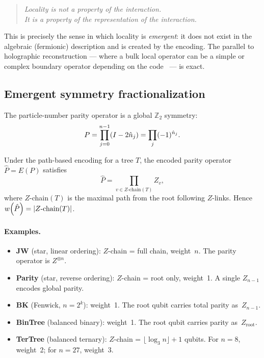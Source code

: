 \begin{quote}\itshape
Locality is not a property of the interaction.\\
It is a property of the \emph{representation} of the interaction.
\end{quote}

This is precisely the sense in which locality is \emph{emergent}: it
does not exist in the algebraic (fermionic) description and is created
by the encoding.  The parallel to holographic reconstruction —  where a
bulk local operator can be a simple or complex boundary operator
depending on the code~\cite{pastawski2015happy} — is exact.


\subsection{Emergent symmetry fractionalization}
\label{sec:em-symmetry}

The particle-number parity operator is a global $\mathbb{Z}_2$ symmetry:
%
\begin{equation}
  P = \prod_{j=0}^{n-1} (I - 2\hat{n}_{j}) = \prod_j (-1)^{\hat{n}_{j}}.
  \label{eq:parity-op}
\end{equation}

\begin{theorem}
\label{thm:parity-weight}
Under the path-based encoding for a tree $T$, the encoded parity
operator $\hat{P} = E(P)$ satisfies
\begin{equation}
  \hat{P} = \prod_{v \in Z\text{-chain}(T)} Z_v,
\end{equation}
where $Z$-chain$(T)$ is the maximal path from the root following
$Z$-links.  Hence $w\!\left(\hat{P}\right) = |Z\text{-chain}(T)|$.
\end{theorem}

\paragraph{Examples.}
\begin{itemize}
  \item \textbf{JW} (star, linear ordering): $Z$-chain = full chain,
    weight~$n$.  The parity operator is $Z^{\otimes n}$.
  \item \textbf{Parity} (star, reverse ordering): $Z$-chain =
    root only, weight~1.  A single $Z_{n-1}$ encodes global parity.
  \item \textbf{BK} (Fenwick, $n = 2^k$): weight~1.  The root qubit
    carries total parity as~$Z_{n-1}$.
  \item \textbf{BinTree} (balanced binary): weight~1.  The root
    qubit carries parity as~$Z_{\text{root}}$.
  \item \textbf{TerTree} (balanced ternary): $Z$-chain =
    $\lfloor \log_3 n \rfloor + 1$ qubits.  For $n = 8$, weight~2;
    for $n = 27$, weight~3.
\end{itemize}

